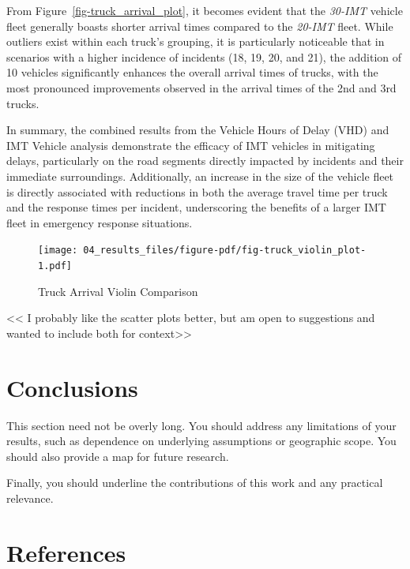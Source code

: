 \documentclass[
  letterpaper,
  authoryear]{elsarticle}
\begin{document}
From Figure~\ref{fig-truck_arrival_plot}, it becomes evident that the
\emph{30-IMT} vehicle fleet generally boasts shorter arrival times
compared to the \emph{20-IMT} fleet. While outliers exist within each
truck's grouping, it is particularly noticeable that in scenarios with a
higher incidence of incidents (18, 19, 20, and 21), the addition of 10
vehicles significantly enhances the overall arrival times of trucks,
with the most pronounced improvements observed in the arrival times of
the 2nd and 3rd trucks.

In summary, the combined results from the Vehicle Hours of Delay (VHD)
and IMT Vehicle analysis demonstrate the efficacy of IMT vehicles in
mitigating delays, particularly on the road segments directly impacted
by incidents and their immediate surroundings. Additionally, an increase
in the size of the vehicle fleet is directly associated with reductions
in both the average travel time per truck and the response times per
incident, underscoring the benefits of a larger IMT fleet in emergency
response situations.

\begin{figure}

{\centering \texttt{[image: 04\_results\_files/figure-pdf/fig-truck\_violin\_plot-1.pdf]}

}

\caption{\label{fig-truck_violin_plot}Truck Arrival Violin Comparison}

\end{figure}

\textless\textless{} I probably like the scatter plots better, but am
open to suggestions and wanted to include both for
context\textgreater\textgreater{}


\hypertarget{conclusions}{%
\section{Conclusions}\label{conclusions}}

This section need not be overly long. You should address any limitations
of your results, such as dependence on underlying assumptions or
geographic scope. You should also provide a map for future research.

Finally, you should underline the contributions of this work and any
practical relevance.


\hypertarget{references}{%
\section*{References}\label{references}}


\renewcommand{\bibsection}{}

\end{document}
